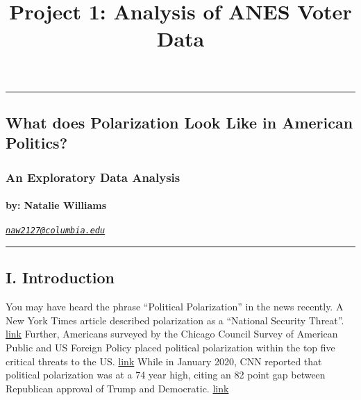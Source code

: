 \documentclass[
]{article}
\title{Project 1: Analysis of ANES Voter Data}
\author{}
\date{\vspace{-2.5em}}
\begin{document}
\maketitle

\begin{center}\rule{0.5\linewidth}{0.5pt}\end{center}

\hypertarget{what-does-polarization-look-like-in-american-politics}{%
\subsection{What does Polarization Look Like in American
Politics?}\label{what-does-polarization-look-like-in-american-politics}}

\hypertarget{an-exploratory-data-analysis}{%
\subsubsection{An Exploratory Data
Analysis}\label{an-exploratory-data-analysis}}

\hypertarget{by-natalie-williams}{%
\paragraph{\texorpdfstring{by: \textbf{Natalie
Williams}}{by: Natalie Williams}}\label{by-natalie-williams}}

\emph{\href{mailto:naw2127@columbia.edu}{\nolinkurl{naw2127@columbia.edu}}}

\begin{center}\rule{0.5\linewidth}{0.5pt}\end{center}

\hypertarget{i.-introduction}{%
\subsection{\texorpdfstring{\textbf{I.
Introduction}}{I. Introduction}}\label{i.-introduction}}

You may have heard the phrase ``Political Polarization'' in the news
recently. A New York Times article described polarization as a
``National Security Threat''.
\href{https://www.nytimes.com/2020/09/22/opinion/trump-national-security.html}{link}
\n Further, Americans surveyed by the Chicago Council Survey of American
Public and US Foreign Policy placed political polarization within the
top five critical threats to the US.
\href{https://www.thechicagocouncil.org/publication/lcc/divided-we-stand}{link}
While in January 2020, CNN reported that political polarization was at a
74 year high, citing an 82 point gap between Republican approval of
Trump and Democratic.
\href{https://www.cnn.com/2020/01/21/politics/trump-political-polarization/index.html}{link}
\end{document}
